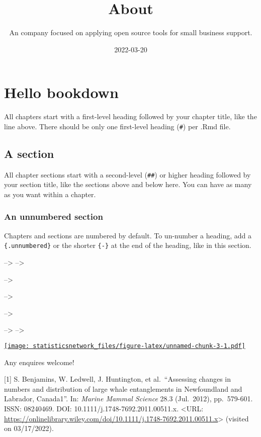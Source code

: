 \documentclass[
]{article}
\title{About}
\subtitle{An company focused on applying open source tools for small business support.}
\author{}
\date{\vspace{-2.5em}2022-03-20}
\theoremstyle{definition}
\theoremstyle{definition}
\theoremstyle{definition}
\theoremstyle{definition}
\theoremstyle{remark}
\begin{document}
\maketitle

{
\setcounter{tocdepth}{2}
\tableofcontents
}
\hypertarget{hello-bookdown}{%
\section{Hello bookdown}\label{hello-bookdown}}

All chapters start with a first-level heading followed by your chapter title, like the line above. There should be only one first-level heading (\texttt{\#}) per .Rmd file.

\hypertarget{a-section}{%
\subsection{A section}\label{a-section}}

All chapter sections start with a second-level (\texttt{\#\#}) or higher heading followed by your section title, like the sections above and below here. You can have as many as you want within a chapter.

\hypertarget{an-unnumbered-section}{%
\subsubsection*{An unnumbered section}\label{an-unnumbered-section}}

Chapters and sections are numbered by default. To un-number a heading, add a \texttt{\{.unnumbered\}} or the shorter \texttt{\{-\}} at the end of the heading, like in this section.

--\textgreater{}
--\textgreater{}

--\textgreater{}

--\textgreater{}

--\textgreater{}

--\textgreater{}
--\textgreater{}

\href{https://discordapp.com/widget?id=944005450830077992\&theme=dark}{\texttt{[image: statisticsnetwork\_files/figure-latex/unnamed-chunk-3-1.pdf]}}

Any enquires welcome!

{[}1{]} S. Benjamins, W. Ledwell, J. Huntington, et al.~``Assessing changes
in numbers and distribution of large whale entanglements in
Newfoundland and Labrador, Canada1''. In: \emph{Marine Mammal Science} 28.3
(Jul.~2012), pp.~579-601. ISSN: 08240469. DOI:
10.1111/j.1748-7692.2011.00511.x. \textless URL:
\url{https://onlinelibrary.wiley.com/doi/10.1111/j.1748-7692.2011.00511.x}\textgreater{}
(visited on 03/17/2022).
\end{document}
